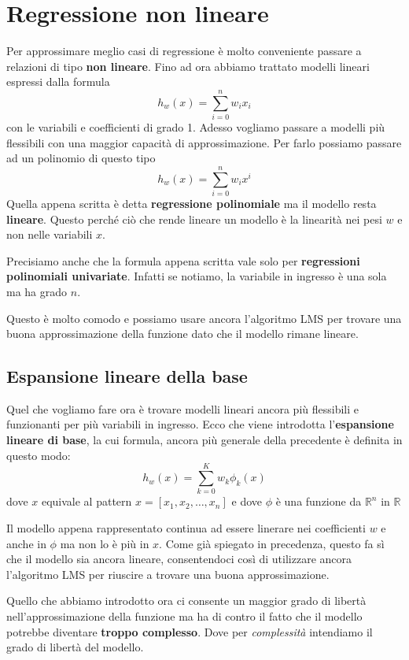 \chapter{Regressione non lineare}
Per approssimare meglio casi di regressione \`e molto conveniente passare a relazioni di tipo \textbf{non lineare}.
Fino ad ora abbiamo trattato modelli lineari espressi dalla formula
\[ h_w(x) = \sum_{i = 0}^n w_i x_i \]
con le variabili e coefficienti di grado 1. Adesso vogliamo passare a modelli pi\`u flessibili con una maggior
capacit\`a di approssimazione. Per farlo possiamo passare ad un polinomio di questo tipo
\[ h_w(x) = \sum_{i = 0}^n w_i x^i \]
Quella appena scritta \`e detta \textbf{regressione polinomiale} ma il modello resta \textbf{lineare}. Questo perch\'e
ci\`o che rende lineare un modello \`e la linearit\`a nei pesi $w$ e non nelle variabili $x$.

Precisiamo anche che la formula appena scritta vale solo per \textbf{regressioni polinomiali univariate}. Infatti se
notiamo, la variabile in ingresso \`e una sola ma ha grado $n$.

Questo \`e molto comodo e possiamo usare ancora l'algoritmo LMS per trovare una buona approssimazione della funzione
dato che il modello rimane lineare.

\section{Espansione lineare della base}
Quel che vogliamo fare ora \`e trovare modelli lineari ancora pi\`u flessibili e funzionanti per pi\`u variabili in
ingresso. Ecco che viene introdotta l'\textbf{espansione lineare di base}, la cui formula, ancora pi\`u generale della
precedente  \`e definita in questo modo:
\[ h_w(x) = \sum_{k = 0}^K w_k \phi_k(x) \]
dove $x$ equivale al pattern $x = [x_1, x_2, \dots, x_n]$ e dove $\phi$ \`e una funzione da
$\mathbb{R}^n$ in $\mathbb{R}$

Il modello appena rappresentato continua ad essere linerare nei coefficienti $w$ e anche in $\phi$ ma non lo \`e pi\`u
in $x$. Come gi\`a spiegato in precedenza, questo fa s\`i che il modello sia ancora lineare, consentendoci cos\`i di
utilizzare ancora l'algoritmo LMS per riuscire a trovare una buona approssimazione.

Quello che abbiamo introdotto ora ci consente un maggior grado di libert\`a nell'approssimazione della funzione ma ha
di contro il fatto che il modello potrebbe diventare \textbf{troppo complesso}. Dove per \emph{complessit\`a} intendiamo
il grado di libert\`a del modello.

